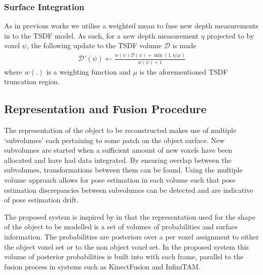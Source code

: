 \subsubsection{Surface Integration}
As in previous works \cite{Newcombe2011,Prisacariu2014} we utilise a weighted mean to fuse new depth measurements in to the TSDF model. As such, 
for a new depth measurement $\eta$ projected to by voxel $\psi$, the following update to the TSDF volume $\mathcal{D}$ is made
\begin{equation}
\begin{split}
\mathcal{D}'(\psi) \leftarrow \frac{w(\psi)\mathcal{D}(\psi) + \min(1, \eta/\mu)}{w(\psi) + 1}
\end{split}
\end{equation}
where $w(.)$ is a weighting function and $\mu$ is the aforementioned TSDF truncation region.

\subsection{Representation and Fusion Procedure}
The representation of the object to be reconstructed makes use of multiple `subvolumes' each pertaining to some patch on the object surface. 
New subvolumes are started when a sufficient amount of new voxels have been allocated and have had data integrated. By ensuring overlap 
between the subvolumes, transformations between them can be found. Using the multiple volume approach allows for pose estimation in each 
volume such that pose estimation discrepancies between subvolumes can be detected and are indicative of pose estimation drift.

The proposed system is inspired by\cite{Kolev2006} in that the representation used for the shape of the object to be modelled is a set of volumes 
of probabilities and surface information. The probabilities are posteriors over a per voxel assignment to either the object voxel set or to the non 
object voxel set. In the proposed system this volume of posterior probabilities is built into with each frame, parallel to the fusion process in systems 
such as KinectFusion\cite{Newcombe2011} and InfiniTAM\cite{Prisacariu2014}.

